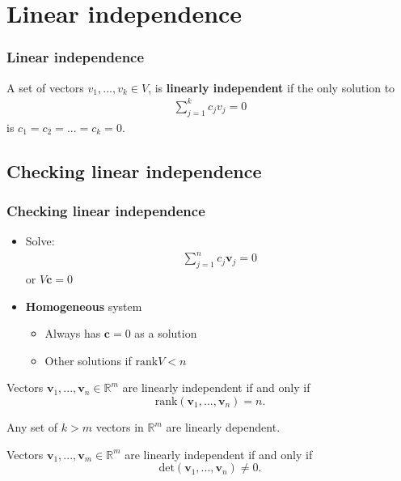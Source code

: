 \documentclass[compress]{beamer}
\def\R{\mathbb{R}}
\renewcommand{\det}{\mathrm{det}}
\newcommand{\rank}{\mathrm{rank}}
\begin{document}
\section{Linear independence}

\begin{frame}\frametitle{Linear independence}
  \begin{definition}
    A set of vectors $v_1, ..., v_k \in V$, is \textbf{linearly
      independent} if the only solution to
    \begin{align*}
      \sum_{j=1}^k c_j v_j = 0 
    \end{align*}
    is $c_1 = c_2 = ... = c_k = 0$. 
  \end{definition}  
\end{frame}

\subsection{Checking linear independence}
\begin{frame}\frametitle{Checking linear independence}
  \begin{itemize}
  \item Solve:
    \begin{align*}
      \sum_{j=1}^n c_j \mathbf{v}_j = 0 
    \end{align*}
    or $V \mathbf{c} = 0 $
  \item \textbf{Homogeneous} system
    \begin{itemize} 
    \item Always has $\mathbf{c}=0$ as a solution
    \item Other solutions if $\rank V < n$ 
    \end{itemize}
  \end{itemize}
\end{frame}

\begin{frame}
  \begin{lemma}\label{lem:rankli}
    Vectors $\mathbf{v}_1, ..., \mathbf{v}_n \in \R^m$ are linearly
    independent if and only if
    \[ \rank(\mathbf{v}_1, ..., \mathbf{v}_n) = n. \]
  \end{lemma}
  \begin{corollary}\label{cor:kmli}
    Any set of $k>m$ vectors in $\R^m$ are linearly dependent.
  \end{corollary}
  \begin{corollary}\label{cor:detli}
    Vectors $\mathbf{v}_1, ..., \mathbf{v}_m \in \R^m$ are linearly
    independent if and only if
    \[ \det(\mathbf{v}_1, ..., \mathbf{v}_n) \neq 0. \]
  \end{corollary}
\end{frame}
\end{document}
